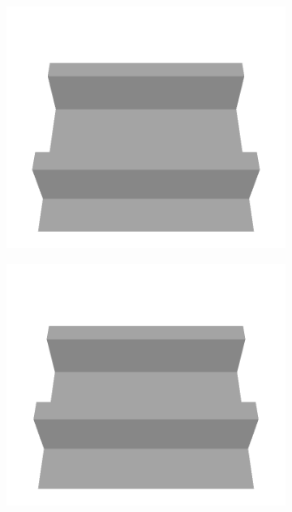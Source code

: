 \documentclass[../document.tex]{subfiles}
\begin{document}
\begin{figure} [htbp]
\begin{subfigure}[b]{0.24\textwidth}
    \includegraphics[width=\linewidth]{../img/5/custom_patches/tunnel/all/13-3d.png}
    \end{subfigure}
    \begin{subfigure}[b]{0.24\textwidth}
    \includegraphics[width=\linewidth]{../img/5/custom_patches/tunnel/all/16-3d.png}
    \end{subfigure}
    \begin{subfigure}[b]{0.24\textwidth}

\end{subfigure}
\end{figure}
\end{document}
